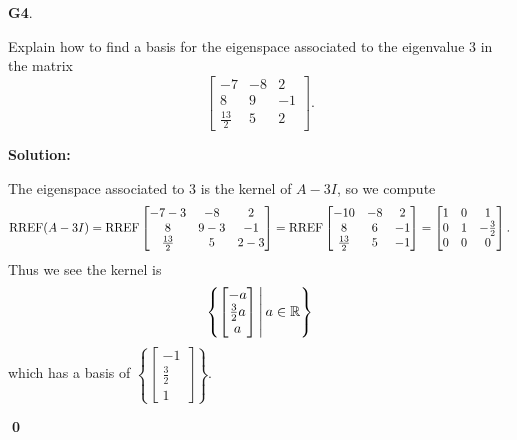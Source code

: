 \documentclass{article}
\newenvironment{problem}[1]
{
  \begin{flushleft}
  \textbf{#1}.
  \ignorespaces
}
{
  \end{flushleft}
}
\newenvironment{solution}
{
  \ignorespaces
  \textbf{Solution:}
}
{
  \ignorespacesafterend
  \begin{flushright}
  {\bfseries \qed}
  \end{flushright}
}
\begin{document}
\begin{problem}{G4}
Explain how to find a basis for the eigenspace associated to the eigenvalue \(3\) in the matrix \[\begin{bmatrix} -7 & -8 & 2 \\ 8 & 9 & -1 \\ \frac{13}{2} & 5 & 2 \end{bmatrix}.\]
\end{problem}
\begin{solution}
The eigenspace associated to \(3\) is the kernel of \(A-3I\), so we compute
\[\operatorname{RREF}(A-3I) = \operatorname{RREF} \begin{bmatrix} -7-3 & -8 & 2 \\ 8 & 9-3 & -1 \\ \frac{13}{2} & 5 & 2-3 \end{bmatrix} = \operatorname{RREF} \begin{bmatrix} -10 & -8 & 2 \\ 8 & 6 & -1 \\ \frac{13}{2} & 5 & -1 \end{bmatrix} = \begin{bmatrix} 1 & 0 & 1 \\ 0 & 1 & -\frac{3}{2} \\ 0 & 0 & 0 \end{bmatrix}.\]
Thus we see the kernel is \[\left\{\begin{bmatrix} -a \\ \frac{3}{2} a \\ a \end{bmatrix}\,\middle|\,a \in \mathbb{R}\right\}\]
which has a basis of \(\left\{ \begin{bmatrix} -1 \\ \frac{3}{2} \\ 1 \end{bmatrix} \right\}\).
\end{solution}
\end{document}
